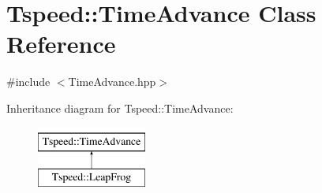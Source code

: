 \hypertarget{classTspeed_1_1TimeAdvance}{\section{Tspeed\-:\-:Time\-Advance Class Reference}
\label{classTspeed_1_1TimeAdvance}
}


{\ttfamily \#include $<$Time\-Advance.\-hpp$>$}

Inheritance diagram for Tspeed\-:\-:Time\-Advance\-:\begin{figure}[H]
\begin{center}
\leavevmode
\includegraphics[height=2.000000cm]{classTspeed_1_1TimeAdvance}
\end{center}
\end{figure}
